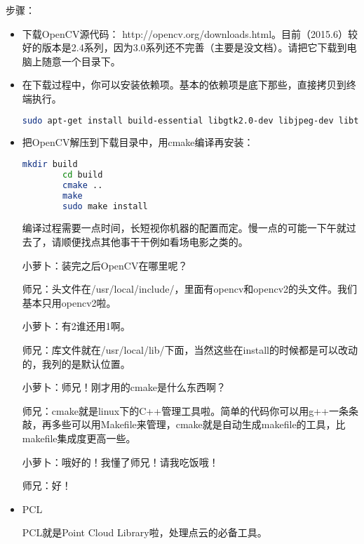 \documentclass[9pt,a4paper]{article}
\begin{document}
步骤：
\begin{itemize}
    \item 下载OpenCV源代码： http://opencv.org/downloads.html。目前（2015.6）较好的版本是2.4系列，因为3.0系列还不完善（主要是没文档）。请把它下载到电脑上随意一个目录下。
    \item 在下载过程中，你可以安装依赖项。基本的依赖项是底下那些，直接拷贝到终端执行。
    \begin{lstlisting}[language=sh]
        sudo apt-get install build-essential libgtk2.0-dev libjpeg-dev libtiff4-dev libjasper-dev libopenexr-dev cmake python-dev python-numpy python-tk libtbb-dev libeigen2-dev yasm libfaac-dev libopencore-amrnb-dev libopencore-amrwb-dev libtheora-dev libvorbis-dev libxvidcore-dev libx264-dev libqt4-dev libqt4-opengl-dev sphinx-common texlive-latex-extra libv4l-dev libdc1394-22-dev libavcodec-dev libavformat-dev libswscale-dev
    \end{lstlisting}
    
    \item 把OpenCV解压到下载目录中，用cmake编译再安装：
    \begin{lstlisting}[language=sh]
        mkdir build
        cd build
        cmake ..
        make
        sudo make install
    \end{lstlisting}
    
    编译过程需要一点时间，长短视你机器的配置而定。慢一点的可能一下午就过去了，请顺便找点其他事干干例如看场电影之类的。
    
    小萝卜：装完之后OpenCV在哪里呢？
    
    师兄：头文件在/usr/local/include/，里面有opencv和opencv2的头文件。我们基本只用opencv2啦。
    
    小萝卜：有2谁还用1啊。
    
    师兄：库文件就在/usr/local/lib/下面，当然这些在install的时候都是可以改动的，我列的是默认位置。
    
    小萝卜：师兄！刚才用的cmake是什么东西啊？
    
    师兄：cmake就是linux下的C++管理工具啦。简单的代码你可以用g++一条条敲，再多些可以用Makefile来管理，cmake就是自动生成makefile的工具，比makefile集成度更高一些。
    
    小萝卜：哦好的！我懂了师兄！请我吃饭哦！
    
    师兄：好！
    
    \item PCL
    
    PCL就是Point Cloud Library啦，处理点云的必备工具。
    

\end{itemize}
\end{document}
